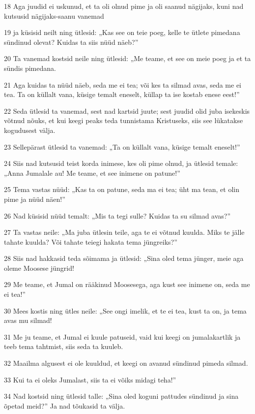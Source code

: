 \par 18 Aga juudid ei uskunud, et ta oli olnud pime ja oli saanud nägijaks, kuni nad kutsusid nägijaks-saanu vanemad
\par 19 ja küsisid neilt ning ütlesid: „Kas see on teie poeg, kelle te ütlete pimedana sündinud olevat? Kuidas ta siis nüüd näeb?”
\par 20 Ta vanemad kostsid neile ning ütlesid: „Me teame, et see on meie poeg ja et ta sündis pimedana.
\par 21 Aga kuidas ta nüüd näeb, seda me ei tea; või kes ta silmad avas, seda me ei tea. Ta on küllalt vana, küsige temalt eneselt, küllap ta ise kostab enese eest!”
\par 22 Seda ütlesid ta vanemad, sest nad kartsid juute; sest juudid olid juba isekeskis võtnud nõuks, et kui keegi peaks teda tunnistama Kristuseks, siis see lükatakse kogudusest välja.
\par 23 Sellepärast ütlesid ta vanemad: „Ta on küllalt vana, küsige temalt eneselt!”
\par 24 Siis nad kutsusid teist korda inimese, kes oli pime olnud, ja ütlesid temale: „Anna Jumalale au! Me teame, et see inimene on patune!”
\par 25 Tema vastas nüüd: „Kas ta on patune, seda ma ei tea; üht ma tean, et olin pime ja nüüd näen!”
\par 26 Nad küsisid nüüd temalt: „Mis ta tegi sulle? Kuidas ta su silmad avas?”
\par 27 Ta vastas neile: „Ma juba ütlesin teile, aga te ei võtnud kuulda. Miks te jälle tahate kuulda? Või tahate teiegi hakata tema jüngreiks?”
\par 28 Siis nad hakkasid teda sõimama ja ütlesid: „Sina oled tema jünger, meie aga oleme Moosese jüngrid!
\par 29 Me teame, et Jumal on rääkinud Moosesega, aga kust see inimene on, seda me ei tea!”
\par 30 Mees kostis ning ütles neile: „See ongi imelik, et te ei tea, kust ta on, ja tema avas mu silmad!
\par 31 Me ju teame, et Jumal ei kuule patuseid, vaid kui keegi on jumalakartlik ja teeb tema tahtmist, siis seda ta kuuleb.
\par 32 Maailma algusest ei ole kuuldud, et keegi on avanud sündinud pimeda silmad.
\par 33 Kui ta ei oleks Jumalast, siis ta ei võiks midagi teha!”
\par 34 Nad kostsid ning ütlesid talle: „Sina oled koguni pattudes sündinud ja sina õpetad meid?” Ja nad tõukasid ta välja.

